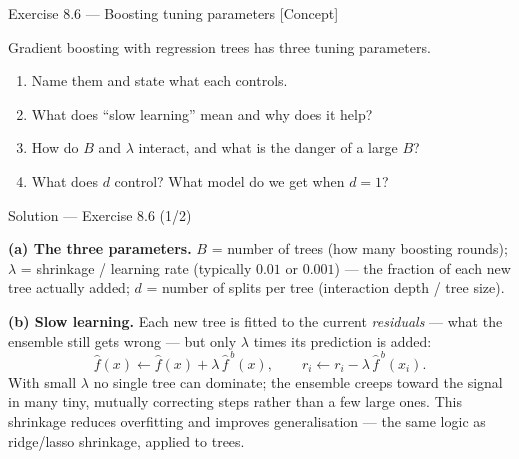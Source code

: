 \documentclass[aspectratio=169,11pt]{beamer}
\begin{document}
\begin{frame}{Exercise 8.6 --- Boosting tuning parameters [Concept]}
\begin{exercise}
Gradient boosting with regression trees has three tuning parameters.
\begin{enumerate}
  \item Name them and state what each controls.
  \item What does ``slow learning'' mean and why does it help?
  \item How do $B$ and $\lambda$ interact, and what is the danger of a large $B$?
  \item What does $d$ control? What model do we get when $d=1$?
\end{enumerate}
\end{exercise}
\end{frame}

\begin{frame}{Solution --- Exercise 8.6 (1/2)}
\begin{solutionbox}
\textbf{(a) The three parameters.} $B$ = number of trees (how many boosting rounds); $\lambda$ = shrinkage / learning rate (typically $0.01$ or $0.001$) --- the fraction of each new tree actually added; $d$ = number of splits per tree (interaction depth / tree size).

\medskip
\textbf{(b) Slow learning.} Each new tree is fitted to the current \emph{residuals} --- what the ensemble still gets wrong --- but only $\lambda$ times its prediction is added:
\[ \hat f(x)\leftarrow\hat f(x)+\lambda\,\hat f^{\,b}(x),\qquad r_i\leftarrow r_i-\lambda\,\hat f^{\,b}(x_i). \]
With small $\lambda$ no single tree can dominate; the ensemble creeps toward the signal in many tiny, mutually correcting steps rather than a few large ones. This shrinkage reduces overfitting and improves generalisation --- the same logic as ridge/lasso shrinkage, applied to trees.
\end{solutionbox}
\end{frame}
\end{document}
